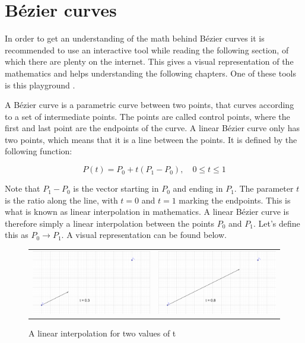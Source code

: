 \newcommand{\timeconstraint}{, \quad 0 \le t \le 1}
\newcommand{\lerp}{\rightarrow}
\newcommand{\p}[1]{P\textsubscript{#1}}

\section{Bézier curves}
    In order to get an understanding of the math behind Bézier curves it is recommended to use an interactive tool while reading the following section, of which there are plenty on the internet. This gives a visual representation of the mathematics and helps understanding the following chapters. One of these tools is this playground \cite{bezier-playground}.

    A Bézier curve is a parametric curve between two points, that curves according to a set of intermediate points. The points are called control points, where the first and last point are the endpoints of the curve. A linear Bézier curve only has two points, which means that it is a line between the points. It is defined by the following function:

    $$
        P(t) = P_0 + t(P_1 - P_0) \timeconstraint
    $$

    Note that $P_1 - P_0$ is the vector starting in $P_0$ and ending in $P_1$. The parameter $t$ is the ratio along the line, with $t = 0$ and $t = 1$ marking the endpoints. This is what is known as linear interpolation in mathematics. A linear Bézier curve is therefore simply a linear interpolation between the points $P_0$ and $P_1$. Let's define this as $P_0 \lerp P_1$. A visual representation can be found below.

    \begin{figure}[H]
        \begin{tabular}{cc}
            \includegraphics[width=0.48\linewidth]{figures/theory/bezier_curves/linear_interpolation1.png} & 
            \includegraphics[width=0.48\linewidth]{figures/theory/bezier_curves/linear_interpolation2.png} \\
        \end{tabular}
        \caption{A linear interpolation for two values of t}
    \end{figure}
    
